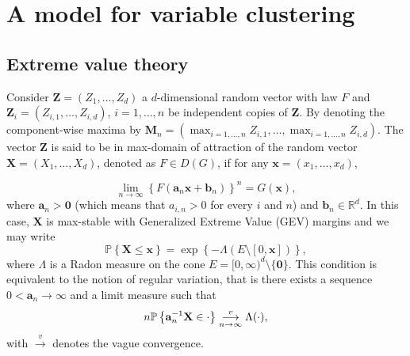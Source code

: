 \documentclass[11pt]{article}
\theoremstyle{definition}
\begin{document}
	\section{A model for variable clustering}
	\label{sec:variable_clust}
	
	\subsection{Extreme value theory} 
	
	Consider $\textbf{Z}= (Z_1,\dots, Z_d)$ a $d$-dimensional random vector with law $F$ and $\textbf{Z}_{i} = (Z_{i,1},\dots, Z_{i,d})$, $i = 1,\dots,n$ be independent copies of $\textbf{Z}$. By denoting the component-wise maxima by $\textbf{M}_n = (\max_{i=1,\dots,n} Z_{i,1}, \dots, \max_{i=1,\dots,n} Z_{i,d})$. The vector $\textbf{Z}$ is said to be in max-domain of attraction of the random vector $\textbf{X} = (X_1, \dots, X_d)$, denoted as $F \in D(G)$, if for any $\textbf{x} = (x_1,\dots,x_d)$,
	
	\begin{equation}
		\label{eq:domain_attraction}
		\underset{n \rightarrow \infty}{\lim} \left\{ F(\textbf{a}_n \textbf{x} + \textbf{b}_n) \right\}^n = G(\textbf{x}),
	\end{equation}
	where $\textbf{a}_n > \textbf{0}$ (which means that $a_{i,n} > 0$ for every $i$ and $n$) and $\textbf{b}_n \in \mathbb{R}^d$. In this case, $\textbf{X}$ is max-stable with Generalized Extreme Value (GEV) margins and we may write
	\begin{equation*}
		\mathbb{P}\left\{ \textbf{X} \leq \textbf{x}\right\} = \exp \left\{ -\Lambda(E \setminus [0,\textbf{x}]) \right\},
	\end{equation*}
	where $\Lambda$ is a Radon measure on the cone $E = [0,\infty)^d \setminus \{\textbf{0}\}$. This condition is equivalent to the notion of regular variation, that is there exists a sequence $0 < \textbf{a}_n \rightarrow \infty$ and a limit measure such that
	\begin{equation*}
		n \mathbb{P}\left\{ \textbf{a}_n^{-1} \textbf{X} \in \cdot \right\} \overunderset{v}{n \rightarrow \infty}{\longrightarrow} \Lambda(\cdot),
	\end{equation*}
	with $\overset{v}{\rightarrow}$ denotes the vague convergence.
	
\end{document}
